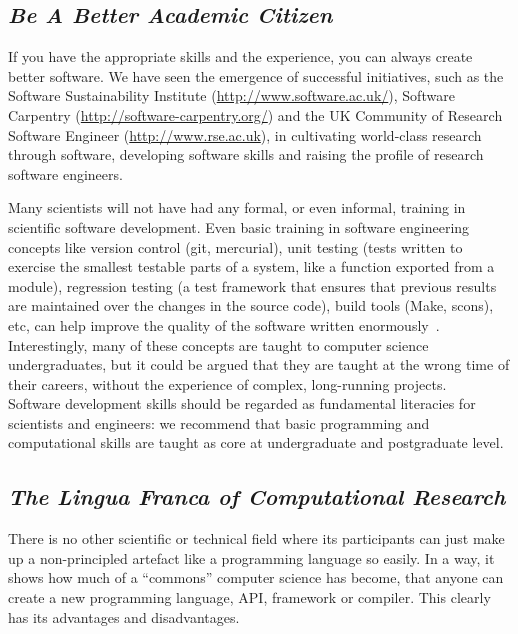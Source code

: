 \documentclass[a4paper,11pt]{article}
\begin{document}
\subsection{{\emph{Be A Better Academic Citizen}}}

If you have the appropriate skills and the experience, you can always
create better software. We have seen the emergence of successful
initiatives, such as the Software Sustainability
Institute (\url{http://www.software.ac.uk/}), Software
Carpentry (\url{http://software-carpentry.org/}) and the UK
Community of Research Software
Engineer (\url{http://www.rse.ac.uk}), in cultivating
world-class research through software, developing software skills and
raising the profile of research software engineers.

Many scientists will not have had any formal, or even informal,
training in scientific software development. Even basic training in
software engineering concepts like version control (git, mercurial),
unit testing (tests written to exercise the smallest testable parts of
a system, like a function exported from a module), regression testing
(a test framework that ensures that previous results are maintained
over the changes in the source code), build tools (Make, scons), etc,
can help improve the quality of the software written
enormously~\cite{wilson2006}.  Interestingly, many of these concepts
are taught to computer science undergraduates, but it could be argued
that they are taught at the wrong time of their careers, without the
experience of complex,
long-running projects.\\

 Software
development skills should be regarded as fundamental literacies for
scientists and engineers: we recommend that basic programming and
computational skills are taught as core at undergraduate and
postgraduate level.

\subsection{{\emph{The Lingua Franca of Computational Research}}}

There is no other scientific or technical field where its participants
can just make up a non-principled artefact like a programming language
so easily. In a way, it shows how much of a ``commons'' computer
science has become, that anyone can create a new programming language,
API, framework or compiler. This clearly has its advantages and
disadvantages.
\end{document}
